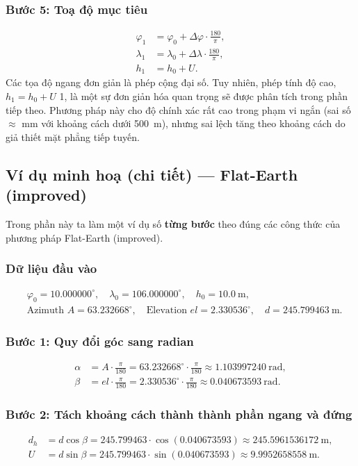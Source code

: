 \subsubsection{Bước 5: Toạ độ mục tiêu}
\[
\begin{aligned}
    \varphi_1 &= \varphi_0 + \Delta\varphi \cdot \frac{180}{\pi},\\
    \lambda_1 &= \lambda_0 + \Delta\lambda \cdot \frac{180}{\pi},\\
    h_1 &= h_0 + U.
\end{aligned}
\]
Các tọa độ ngang đơn giản là phép cộng đại số. Tuy nhiên, phép tính độ cao, $h_1 = h_0 + U$ 1, là một sự đơn giản hóa quan trọng sẽ được phân tích trong phần tiếp theo. Phương pháp này cho độ chính xác rất cao trong phạm vi ngắn (sai số $\approx$ mm với khoảng cách dưới 500~m), nhưng sai lệch tăng theo khoảng cách do giả thiết mặt phẳng tiếp tuyến.
\subsection{Ví dụ minh hoạ (chi tiết) — Flat-Earth (improved)}
Trong phần này ta làm một ví dụ số \textbf{từng bước} theo đúng các công thức của phương pháp Flat-Earth (improved).

\subsubsection*{Dữ liệu đầu vào}
\[
\begin{aligned}
&\varphi_0 = 10.000000^\circ,\quad \lambda_0 = 106.000000^\circ,\quad h_0 = 10.0\ \mathrm{m},\\
&\text{Azimuth } A = 63.232668^\circ,\quad \text{Elevation } el = 2.330536^\circ,\quad d = 245.799463\ \mathrm{m}.
\end{aligned}
\]

\subsubsection*{Bước 1: Quy đổi góc sang radian}
\[
\begin{aligned}
\alpha &= A\cdot\frac{\pi}{180} = 63.232668^\circ\cdot\frac{\pi}{180} \approx 1.103997240\ \text{rad},\\[4pt]
\beta &= el\cdot\frac{\pi}{180} = 2.330536^\circ\cdot\frac{\pi}{180} \approx 0.040673593\ \text{rad}.
\end{aligned}
\]

\subsubsection*{Bước 2: Tách khoảng cách thành thành phần ngang và đứng}
\[
\begin{aligned}
d_h &= d\cos\beta = 245.799463\cdot\cos(0.040673593) \approx 245.5961536172\ \mathrm{m},\\[4pt]
U   &= d\sin\beta = 245.799463\cdot\sin(0.040673593) \approx 9.9952658558\ \mathrm{m}.
\end{aligned}
\]

